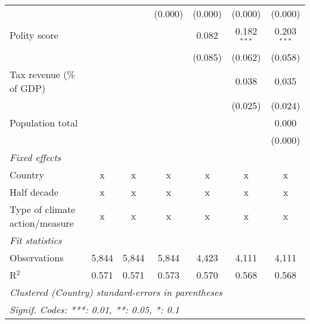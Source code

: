 \begin{tabular}{lcccccc}
                                                                               &         &                & (0.000)        & (0.000)        & (0.000)        & (0.000)\\   
   Polity score                                                                &         &                &                & 0.082          & 0.182$^{***}$  & 0.203$^{***}$\\   
                                                                               &         &                &                & (0.085)        & (0.062)        & (0.058)\\   
   Tax revenue (\% of GDP)                                                     &         &                &                &                & 0.038          & 0.035\\   
                                                                               &         &                &                &                & (0.025)        & (0.024)\\   
   Population total                                                            &         &                &                &                &                & 0.000\\   
                                                                               &         &                &                &                &                & (0.000)\\   
   \emph{Fixed effects}\\
   Country                                                                     & x       & x              & x              & x              & x              & x\\  
   Half decade                                                                 & x       & x              & x              & x              & x              & x\\  
   Type of climate action/measure                                              & x       & x              & x              & x              & x              & x\\  
   \midrule \emph{Fit statistics}\\
   Observations                                                                & 5,844   & 5,844          & 5,844          & 4,423          & 4,111          & 4,111\\  
   R$^2$                                                                       & 0.571   & 0.571          & 0.573          & 0.570          & 0.568          & 0.568\\  
   \midrule
   \multicolumn{7}{l}{\emph{Clustered (Country) standard-errors in parentheses}}\\
   \multicolumn{7}{l}{\emph{Signif. Codes: ***: 0.01, **: 0.05, *: 0.1}}\\
\end{tabular}
\par\endgroup


